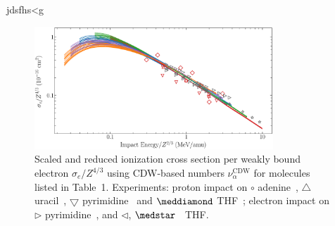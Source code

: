 \documentclass[10pt,showpacs,twocolumn]{revtex4}
\begin{document}
\newpage

jdsfhs<g

\begin{figure}[t!]
\centering
\includegraphics[width=0.8\textwidth]{figuras/z13mol85.eps}
\caption{Scaled and reduced ionization cross section per weakly bound 
electron $\sigma_e/Z^{4/3}$ using CDW-based numbers $\nu_{\alpha}^{\text{CDW}}$ 
for molecules listed in Table~1.
Experiments: proton impact on 
\mbox{\Large$\circ$} adenine~\cite{iriki2011}, 
$\triangle$ uracil~\cite{itoh2013}, 
$\bigtriangledown$ pyrimidine~\cite{wolff2014} and $\meddiamond$ 
THF~\cite{wang2016}; electron impact on $\rhd$ pyrimidine~\cite{bug2017},
and $\lhd$, $\medstar$~\cite{wolf2019,fuss2009} THF.}
\label{fig:z3redscaled}
\end{figure}



\bigskip
\end{document}

